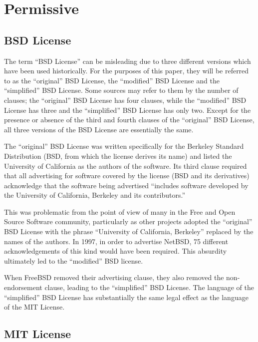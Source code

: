 \documentclass[12pt,letterpaper]{article}
\begin{document}
\section{Permissive}

\subsection{BSD License}

The term ``BSD License'' can be misleading due to three different versions which have been used historically. For the purposes of this paper, they will be referred to as the ``original'' BSD License, the ``modified'' BSD License and the ``simplified'' BSD License. Some sources may refer to them by the number of clauses; the ``original'' BSD License has four clauses, while the ``modified'' BSD License has three and the ``simplified'' BSD License has only two. Except for the presence or absence of the third and fourth clauses of the ``original'' BSD License, all three versions of the BSD License are essentially the same.

The ``original'' BSD License was written specifically for the Berkeley Standard Distribution (BSD, from which the license derives its name) and listed the University of California as the authors of the software. Its third clause required that all advertising for software covered by the license (BSD and its derivatives) acknowledge that the software being advertised ``includes software developed by the University of California, Berkeley and its contributors.''

This was problematic from the point of view of many in the Free and Open Source Software community, particularly as other projects adopted the ``original'' BSD License with the phrase ``University of California, Berkeley'' replaced by the names of the authors. In 1997, in order to advertise NetBSD, 75 different acknowledgements of this kind would have been required. This absurdity ultimately led to the ``modified'' BSD license.

When FreeBSD removed their advertising clause, they also removed the non-endorsement clause, leading to the ``simplified'' BSD License. The language of the ``simplified'' BSD License has substantially the same legal effect as the language of the MIT License.

\subsection{MIT License}
\end{document}

